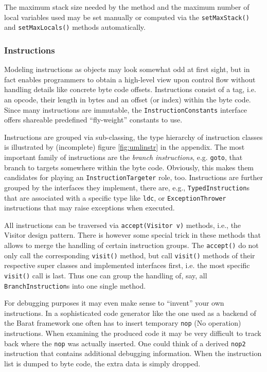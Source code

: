 \documentclass[12pt,twoside]{article}
\begin{document}
The maximum stack size needed by the method and the maximum number of
local variables used may be set manually or computed via the
\texttt{setMaxStack()} and \texttt{setMaxLocals()} methods
automatically.

\subsubsection{Instructions}

Modeling instructions as objects may look somewhat odd at first sight,
but in fact enables programmers to obtain a high-level view upon
control flow without handling details like concrete byte code offsets.
Instructions consist of a tag, i.e. an opcode, their length in bytes
and an offset (or index) within the byte code. Since many instructions
are immutable, the \texttt{InstructionConstants} interface offers
shareable predefined ``fly-weight'' constants to use.

Instructions are grouped via sub-classing, the type hierarchy of
instruction classes is illustrated by (incomplete) figure
\ref{fig:umlinstr} in the appendix.  The most important family of
instructions are the \emph{branch instructions}, e.g.  \texttt{goto},
that branch to targets somewhere within the byte code.  Obviously,
this makes them candidates for playing an \texttt{InstructionTargeter}
role, too. Instructions are further grouped by the interfaces they
implement, there are, e.g., \texttt{TypedInstruction}s that are
associated with a specific type like \texttt{ldc}, or
\texttt{ExceptionThrower} instructions that may raise exceptions when
executed.

All instructions can be traversed via \texttt{accept(Visitor v)} methods,
i.e., the Visitor design pattern. There is however some special trick
in these methods that allows to merge the handling of certain
instruction groups. The \texttt{accept()} do not only call the
corresponding \texttt{visit()} method, but call \texttt{visit()}
methods of their respective super classes and implemented interfaces
first, i.e. the most specific \texttt{visit()} call is last. Thus one
can group the handling of, say, all \texttt{BranchInstruction}s into
one single method.

For debugging purposes  it may even make sense  to ``invent'' your own
instructions. In a sophisticated code generator like the one used as a
backend of  the Barat framework  \cite{barat} one often has  to insert
temporary  \texttt{nop} (No  operation) instructions.   When examining
the produced  code it may  be very difficult  to track back  where the
\texttt{nop}  was actually  inserted.  One  could think  of  a derived
\texttt{nop2}   instruction   that   contains   additional   debugging
information. When  the instruction  list is dumped  to byte  code, the
extra data is simply dropped.
\end{document}
